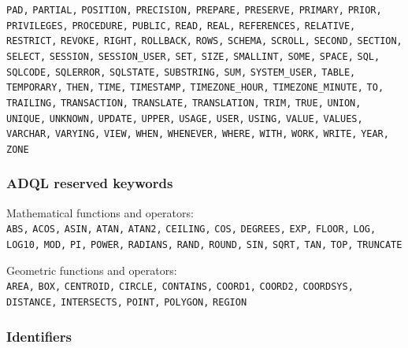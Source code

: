 \documentclass[11pt,a4paper]{ivoa}
\begin{document}
\texttt{PAD,} \texttt{PARTIAL,} \texttt{POSITION,} 
\texttt{PRECISION,} \texttt{PREPARE,} \texttt{PRESERVE,} 
\texttt{PRIMARY,} \texttt{PRIOR,} \texttt{PRIVILEGES,} 
\texttt{PROCEDURE,} \texttt{PUBLIC,} \texttt{READ,} \texttt{REAL,} 
\texttt{REFERENCES,} \texttt{RELATIVE,} \texttt{RESTRICT,} 
\texttt{REVOKE,} \texttt{RIGHT,} \texttt{ROLLBACK,} \texttt{ROWS,} 
\texttt{SCHEMA,} \texttt{SCROLL,} \texttt{SECOND,} \texttt{SECTION,} 
\texttt{SELECT,} \texttt{SESSION,} \texttt{SESSION\_USER,} 
\texttt{SET,} \texttt{SIZE,} \texttt{SMALLINT,} \texttt{SOME,} 
\texttt{SPACE,} \texttt{SQL,} \texttt{SQLCODE,} \texttt{SQLERROR,} 
\texttt{SQLSTATE,} \texttt{SUBSTRING,} \texttt{SUM,} 
\texttt{SYSTEM\_USER,} \texttt{TABLE,} \texttt{TEMPORARY,} 
\texttt{THEN,} \texttt{TIME,} \texttt{TIMESTAMP,} 
\texttt{TIMEZONE\_HOUR,} \texttt{TIMEZONE\_MINUTE,} \texttt{TO,} 
\texttt{TRAILING,} \texttt{TRANSACTION,} \texttt{TRANSLATE,} 
\texttt{TRANSLATION,} \texttt{TRIM,} \texttt{TRUE,} \texttt{UNION,} 
\texttt{UNIQUE,} \texttt{UNKNOWN,} \texttt{UPDATE,} \texttt{UPPER,} 
\texttt{USAGE,} \texttt{USER,} \texttt{USING,} \texttt{VALUE,} 
\texttt{VALUES,} \texttt{VARCHAR,} \texttt{VARYING,} \texttt{VIEW,} 
\texttt{WHEN,} \texttt{WHENEVER,} \texttt{WHERE,} \texttt{WITH,} 
\texttt{WORK,} \texttt{WRITE,} \texttt{YEAR,} \texttt{ZONE} 

\subsubsection{ADQL reserved keywords}
\label{sec:adql.reswords}

\noindent
Mathematical functions and operators:\\
\noindent
\texttt{ABS,} \texttt{ACOS,} \texttt{ASIN,} \texttt{ATAN,} 
\texttt{ATAN2,} \texttt{CEILING,} \texttt{COS,} \texttt{DEGREES,} 
\texttt{EXP,} \texttt{FLOOR,} \texttt{LOG,} \texttt{LOG10,} 
\texttt{MOD,} \texttt{PI,} \texttt{POWER,} \texttt{RADIANS,} 
\texttt{RAND,} \texttt{ROUND,} \texttt{SIN,} \texttt{SQRT,} 
\texttt{TAN,} \texttt{TOP,} \texttt{TRUNCATE}
\newline

\noindent
Geometric functions and operators:\\
\noindent
\texttt{AREA,} \texttt{BOX,} \texttt{CENTROID,} \texttt{CIRCLE,} 
\texttt{CONTAINS,} \texttt{COORD1,} \texttt{COORD2,} 
\texttt{COORDSYS,} \texttt{DISTANCE,} \texttt{INTERSECTS,} 
\texttt{POINT,} \texttt{POLYGON,} \texttt{REGION}

\subsubsection{Identifiers}
\label{sec:adql.identifiers}
\end{document}
